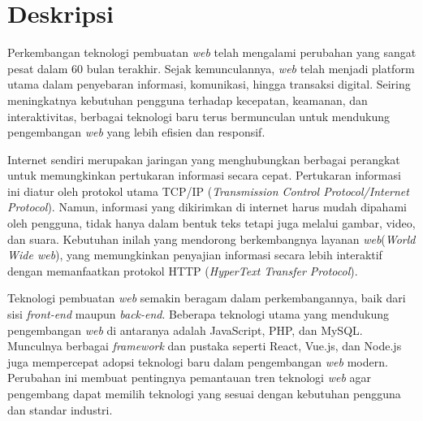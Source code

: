 \documentclass[a4paper,twoside]{article}
\newcommand{\web}{\textit{web}\xspace}
\begin{document}
	
	\title{\@judultopik}
	\author{\nama \textendash \@npm} 
	
	\newcommand{\nama}{Alfonsus Oktario Sutomo}
	\newcommand{\@npm}{6181801010}
	\newcommand{\@judultopik}{Perkembangan Penggunaan Teknologi Pembangunan Web Dunia} %
	\newcommand{\jumpemb}{1} %
	\newcommand{\tanggal}{19/02/2025}
	
	
	\maketitle
	
	
	\section{Deskripsi}
Perkembangan teknologi pembuatan \web telah mengalami perubahan yang sangat pesat dalam 60 bulan terakhir. Sejak kemunculannya, \web telah menjadi platform utama dalam penyebaran informasi, komunikasi, hingga transaksi digital. Seiring meningkatnya kebutuhan pengguna terhadap kecepatan, keamanan, dan interaktivitas, berbagai teknologi baru terus bermunculan untuk mendukung pengembangan \web yang lebih efisien dan responsif.

Internet sendiri merupakan jaringan yang menghubungkan berbagai perangkat untuk memungkinkan pertukaran informasi secara cepat. Pertukaran informasi ini diatur oleh protokol utama TCP/IP (\textit{Transmission Control Protocol/Internet Protocol}). Namun, informasi yang dikirimkan di internet harus mudah dipahami oleh pengguna, tidak hanya dalam bentuk teks tetapi juga melalui gambar, video, dan suara. Kebutuhan inilah yang mendorong berkembangnya layanan \web (\textit{World Wide \web}), yang memungkinkan penyajian informasi secara lebih interaktif dengan memanfaatkan protokol HTTP (\textit{HyperText Transfer Protocol}).

Teknologi pembuatan \web semakin beragam dalam perkembangannya, baik dari sisi \textit{front-end} maupun \textit{back-end}. Beberapa teknologi utama yang mendukung pengembangan \web di antaranya adalah JavaScript, PHP, dan MySQL. Munculnya berbagai \textit{framework} dan pustaka seperti React, Vue.js, dan Node.js juga mempercepat adopsi teknologi baru dalam pengembangan \web modern. Perubahan ini membuat pentingnya pemantauan tren teknologi \web agar pengembang dapat memilih teknologi yang sesuai dengan kebutuhan pengguna dan standar industri.
\end{document}
